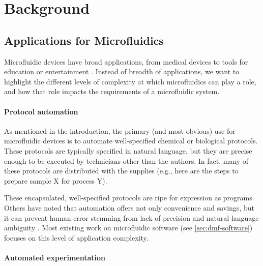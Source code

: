\documentclass{jpaper}
\begin{document}
\section{Background}
\label{sec:background}

\subsection{Applications for Microfluidics}
Microfluidic devices have broad applications, from medical devices \cite{coelho2017digital} to tools for education or entertainment \cite{opendrop, mit-medialab}.
Instead of breadth of applications, we want to highlight the different levels of complexity at which microfluidics can play a role, and how that role impacts the requirements of a microfluidic system.

\paragraph{Protocol automation}
As mentioned in the introduction, the primary (and most obvious) use for microfluidic devices is to automate well-specified chemical or biological protocols.
These protocols are typically specified in natural language, but they are precise enough to be executed by technicians other than the authors.
In fact, many of these protocols are distributed with the supplies (e.g., here are the steps to prepare sample X for process Y).

These encapsulated, well-specified protocols are ripe for expression as programs.
Others have noted that automation offers not only convenience and savings, but it can prevent human error stemming from lack of precision and natural language ambiguity \cite{antha-qbd}.
Most existing work on microfluidic software (see \autoref{sec:dmf-software}) focuses on this level of application complexity.


\paragraph{Automated experimentation}
\end{document}
